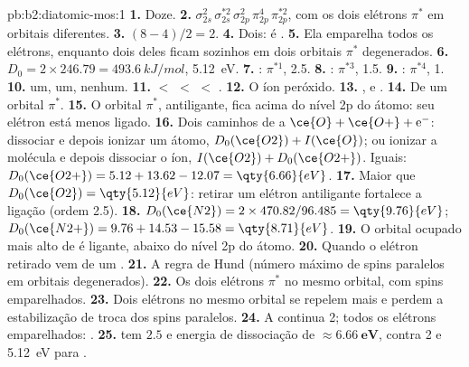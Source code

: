 \begin{solution}{pb:b2:diatomic-mos:1}
\textbf{1.} Doze.
\textbf{2.} $\sigma_{2s}^2\,\sigma_{2s}^{*2}\,\sigma_{2p}^2\,\pi_{2p}^4\,\pi_{2p}^{*2}$, com os dois elétrons $\pi^*$
em orbitais diferentes.
\textbf{3.} $(8 - 4)/2 = 2$.
\textbf{4.} Dois:  é .
\textbf{5.} Ela emparelha todos os elétrons, enquanto dois deles ficam sozinhos
em dois orbitais $\pi^*$ degenerados.
\textbf{6.} $D_0 = 2 \times 246.79 = \qty{493.6}{kJ/mol}$, \qty{5.12}{eV}.
\textbf{7.} : $\pi^{*1}$,  2.5.
\textbf{8.} : $\pi^{*3}$,  1.5.
\textbf{9.} : $\pi^{*4}$,  1.
\textbf{10.}  um,  um,  nenhum.
\textbf{11.}  $<$  $<$  $<$ .
\textbf{12.} O íon peróxido.
\textbf{13.} ,  e .
\textbf{14.} De um orbital $\pi^*$.
\textbf{15.} O orbital $\pi^*$, antiligante, fica acima do nível 2p do átomo: seu
elétron está menos ligado.
\textbf{16.} Dois caminhos de  a $\ce{O} + \ce{O+} + \mathrm e^-$: dissociar e depois
ionizar um átomo, $D_0(\ce{O2}) + I(\ce{O})$; ou ionizar a molécula e depois dissociar
o íon, $I(\ce{O2}) + D_0(\ce{O2+})$. Iguais: $D_0(\ce{O2+}) = 5.12 + 13.62 - 12.07 = \qty{6.66}{eV}$.
\textbf{17.} Maior que $D_0(\ce{O2}) = \qty{5.12}{eV}$: retirar um elétron antiligante
fortalece a ligação (ordem 2.5).
\textbf{18.} $D_0(\ce{N2}) = 2 \times 470.82/96.485 = \qty{9.76}{eV}$; $D_0(\ce{N2+}) = 9.76 +
14.53 - 15.58 = \qty{8.71}{eV}$.
\textbf{19.} O orbital ocupado mais alto de  é ligante, abaixo do nível 2p
do átomo.
\textbf{20.} Quando o elétron retirado vem de um .
\textbf{21.} A regra de Hund (número máximo de spins paralelos em orbitais
degenerados).
\textbf{22.} Os dois elétrons $\pi^*$ no mesmo orbital, com spins emparelhados.
\textbf{23.} Dois elétrons no mesmo orbital se repelem mais e perdem a
estabilização de troca dos spins paralelos.
\textbf{24.} A  continua 2; todos os elétrons emparelhados:
.
\textbf{25.}  tem  $\boldsymbol{2.5}$ e energia de dissociação de
$\boldsymbol{\approx \qty{6.66}{eV}}$, contra 2 e \qty{5.12}{eV} para .
\end{solution}
